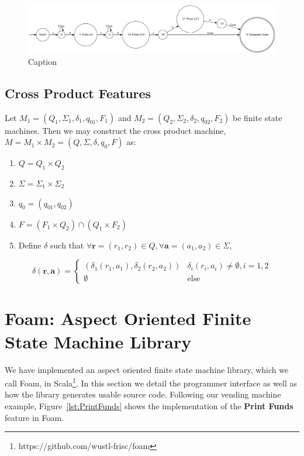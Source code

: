 \documentclass[sigplan,anonymous,review]{acmart}
\begin{document}
\begin{figure}
    \centering
    \includegraphics[width=\textwidth]{figures/vend3.pdf}
    \caption{Caption}
    \label{fig:my_label}
\end{figure}

\subsection{Cross Product Features}\label{sec:cpalg}

Let $M_1 = (Q_1, \Sigma_1, \delta_1, q_{01}, F_1)$ and $M_2 = (Q_2, \Sigma_2, \delta_2, q_{02}, F_2)$ be finite state machines. Then we may construct the cross product machine, $M = M_1 \times M_2 = (Q, \Sigma, \delta, q_0, F)$ as: 

\begin{enumerate}
    \item $Q = Q_1 \times Q_2$
    \item $\Sigma = \Sigma_1 \times \Sigma_2$
    \item $q_0 = (q_{01}, q_{02})$
    \item $F = (F_1 \times Q_2) \cap (Q_1 \times F_2)$
    \item Define $\delta$ such that $\forall \mathbf{r} = (r_1, r_2) \in Q, \forall \mathbf{a} = (a_1, a_2) \in \Sigma,$ 
\end{enumerate}
\[\delta(\mathbf r, \mathbf a) = \begin{cases}
    (\delta_1(r_1, a_1), \delta_2(r_2, a_2)) & \delta_i(r_i, a_i) \neq \emptyset, i = 1, 2\\
    \emptyset & \mathrm{else}
\end{cases}\]

\section{Foam: Aspect Oriented Finite State Machine Library}
We have implemented an aspect oriented finite state machine library, which we call Foam,  in Scala\footnote{https://github.com/wustl-frisc/foam}. In this section we detail the programmer interface as well as how the library generates usable source code. Following our vending machine example, Figure~\ref{lst:PrintFunds} shows the implementation of the \textbf{Print Funds} feature in Foam.
\end{document}
